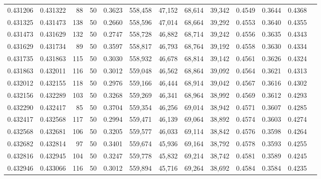 \begin{tabular}{rrrrrrrrrrrrr}
0.431206 & 0.431322 &    88 &  50 &                                     0.3623 & 558,458 &  47,152 &  68,614 &  39,342 & 0.4549 & 0.3644 & 0.4368 \\
0.431325 & 0.431473 &   138 &  50 &                                     0.2660 & 558,596 &  47,014 &  68,664 &  39,292 & 0.4553 & 0.3640 & 0.4355 \\
0.431473 & 0.431629 &   132 &  50 &                                     0.2747 & 558,728 &  46,882 &  68,714 &  39,242 & 0.4556 & 0.3635 & 0.4343 \\
0.431629 & 0.431734 &    89 &  50 &                                     0.3597 & 558,817 &  46,793 &  68,764 &  39,192 & 0.4558 & 0.3630 & 0.4334 \\
0.431735 & 0.431863 &   115 &  50 &                                     0.3030 & 558,932 &  46,678 &  68,814 &  39,142 & 0.4561 & 0.3626 & 0.4324 \\
0.431863 & 0.432011 &   116 &  50 &                                     0.3012 & 559,048 &  46,562 &  68,864 &  39,092 & 0.4564 & 0.3621 & 0.4313 \\
0.432012 & 0.432155 &   118 &  50 &                                     0.2976 & 559,166 &  46,444 &  68,914 &  39,042 & 0.4567 & 0.3616 & 0.4302 \\
0.432156 & 0.432289 &   103 &  50 &                                     0.3268 & 559,269 &  46,341 &  68,964 &  38,992 & 0.4569 & 0.3612 & 0.4293 \\
0.432290 & 0.432417 &    85 &  50 &                                     0.3704 & 559,354 &  46,256 &  69,014 &  38,942 & 0.4571 & 0.3607 & 0.4285 \\
0.432417 & 0.432568 &   117 &  50 &                                     0.2994 & 559,471 &  46,139 &  69,064 &  38,892 & 0.4574 & 0.3603 & 0.4274 \\
0.432568 & 0.432681 &   106 &  50 &                                     0.3205 & 559,577 &  46,033 &  69,114 &  38,842 & 0.4576 & 0.3598 & 0.4264 \\
0.432682 & 0.432814 &    97 &  50 &                                     0.3401 & 559,674 &  45,936 &  69,164 &  38,792 & 0.4578 & 0.3593 & 0.4255 \\
0.432816 & 0.432945 &   104 &  50 &                                     0.3247 & 559,778 &  45,832 &  69,214 &  38,742 & 0.4581 & 0.3589 & 0.4245 \\
0.432946 & 0.433066 &   116 &  50 &                                     0.3012 & 559,894 &  45,716 &  69,264 &  38,692 & 0.4584 & 0.3584 & 0.4235 \\

\end{tabular}
